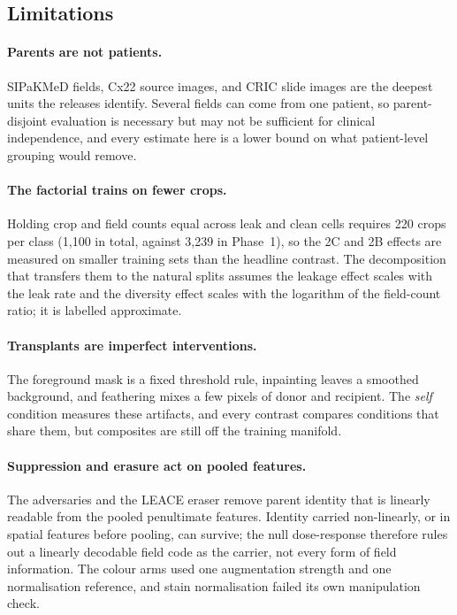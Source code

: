\subsection{Limitations}
\label{sec:limitations}

\paragraph{Parents are not patients.} SIPaKMeD fields, Cx22 source images, and CRIC slide
images are the deepest units the releases identify. Several fields can come from one
patient, so parent-disjoint evaluation is necessary but may not be sufficient for
clinical independence, and every estimate here is a lower bound on what patient-level
grouping would remove.

\paragraph{The factorial trains on fewer crops.} Holding crop and field counts equal
across leak and clean cells requires 220 crops per class (1,100 in total, against 3,239
in Phase~1), so the 2C and 2B effects are measured on smaller training sets than the
headline contrast. The decomposition that transfers them to the natural splits assumes
the leakage effect scales with the leak rate and the diversity effect scales with the
logarithm of the field-count ratio; it is labelled approximate.

\paragraph{Transplants are imperfect interventions.} The foreground mask is a fixed
threshold rule, inpainting leaves a smoothed background, and feathering mixes a few
pixels of donor and recipient. The \emph{self} condition measures these artifacts, and
every contrast compares conditions that share them, but composites are still off the
training manifold.

\paragraph{Suppression and erasure act on pooled features.} The adversaries and the LEACE eraser
remove parent identity that is linearly readable from the pooled penultimate features. Identity
carried non-linearly, or in spatial features before pooling, can survive; the null dose-response
therefore rules out a linearly decodable field code as the carrier, not every form of field
information. The colour arms used one augmentation strength and one normalisation reference, and
stain normalisation failed its own manipulation check.

